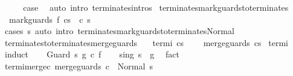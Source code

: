 \begin{isabellebody}
\isanewline
\ \ \isamarkupfalse%
\ \isamarkupfalse%
\ {\isacharquery}case\ \isamarkupfalse%
\ {\isacharparenleft}auto\ intro{\isacharcolon}\ terminates{\isachardot}intros{\isacharparenright}\isanewline
{}\isamarkupfalse%
%
\endisatagproof
{\isafoldproof}%
%
\isadelimproof
\isanewline
%
\endisadelimproof
\isanewline
{}\isamarkupfalse%
\ terminates{\isacharunderscore}mark{\isacharunderscore}guards{\isacharunderscore}to{\isacharunderscore}terminates{\isacharcolon}\isanewline
\ \ {\isachardoublequoteopen}{\isasymGamma}{\isasymturnstile}mark{\isacharunderscore}guards\ f\ c{\isasymdown}s\ {\isasymLongrightarrow}\ {\isasymGamma}{\isasymturnstile}c{\isasymdown}\ s{\isachardoublequoteclose}\isanewline
%
\isadelimproof
\ \ %
\endisadelimproof
%
\isatagproof
{}\isamarkupfalse%
\ {\isacharparenleft}cases\ s{\isacharparenright}\ {\isacharparenleft}auto\ intro{\isacharcolon}\ terminates{\isacharunderscore}mark{\isacharunderscore}guards{\isacharunderscore}to{\isacharunderscore}terminates{\isacharunderscore}Normal{\isacharparenright}%
\endisatagproof
{\isafoldproof}%
%
\isadelimproof
%
\endisadelimproof
%
\isamarkuptrue%
\isamarkupfalse%
\ terminates{\isacharunderscore}to{\isacharunderscore}terminates{\isacharunderscore}merge{\isacharunderscore}guards{\isacharcolon}\isanewline
\ \ \ termi{\isacharcolon}\ {\isachardoublequoteopen}{\isasymGamma}{\isasymturnstile}c{\isasymdown}s{\isachardoublequoteclose}\ \isanewline
\ \ \ {\isachardoublequoteopen}{\isasymGamma}{\isasymturnstile}merge{\isacharunderscore}guards\ c{\isasymdown}s{\isachardoublequoteclose}\isanewline
%
\isadelimproof
%
\endisadelimproof
%
\isatagproof
{}\isamarkupfalse%
\ termi\isanewline
{}\isamarkupfalse%
\ {\isacharparenleft}induct{\isacharparenright}\isanewline
\ \ \isamarkupfalse%
\ {\isacharparenleft}Guard\ s\ g\ c\ f{\isacharparenright}\isanewline
\ \ \isamarkupfalse%
\ s{\isacharunderscore}in{\isacharunderscore}g{\isacharcolon}\ {\isachardoublequoteopen}s\ {\isasymin}\ g{\isachardoublequoteclose}\ \isamarkupfalse%
\ fact\isanewline
\ \ \isamarkupfalse%
\ termi{\isacharunderscore}merge{\isacharunderscore}c{\isacharcolon}\ {\isachardoublequoteopen}{\isasymGamma}{\isasymturnstile}merge{\isacharunderscore}guards\ c\ {\isasymdown}\ Normal\ s{\isachardoublequoteclose}\ \isamarkupfalse%

\end{isabellebody}
